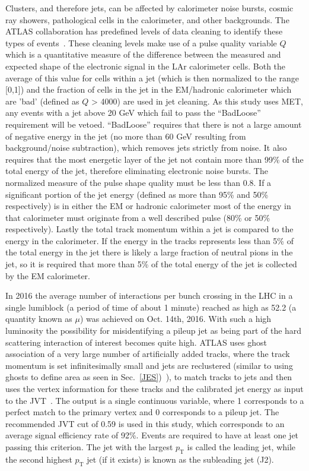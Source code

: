 Clusters, and therefore jets, can be affected by calorimeter noise bursts, cosmic ray showers, pathological cells in the calorimeter, and other backgrounds.  
The ATLAS collaboration has predefined levels of data cleaning to identify these types of events~\cite{ATLAS-CONF-2015-029}.  
These cleaning levels make use of a pulse quality variable $Q$ which is a quantitative measure of the difference between the measured and expected shape of the electronic signal in the LAr calorimeter cells.  
Both the average of this value for cells within a jet (which is then normalized to the range [0,1]) and the fraction of cells in the jet in the EM/hadronic calorimeter which are 'bad' (defined as $Q$ > 4000) are used in jet cleaning.  
As this study uses MET, any events with a jet above 20 GeV which fail to pass the ``BadLoose'' requirement will be vetoed.  
``BadLoose'' requires that there is not a large amount of negative energy in the jet (no more than 60 GeV resulting from background/noise subtraction), which removes jets strictly from noise.   
It also requires that the most energetic layer of the jet not contain more than 99\% of the total energy of the jet, therefore eliminating electronic noise bursts.   
The normalized measure of the pulse shape quality must be less than 0.8.  
If a significant portion of the jet energy (defined as more than 95\% and 50\% respectively) is in either the EM or hadronic calorimeter most of the energy in that calorimeter must originate from a well described pulse (80\% or 50\% respectively).  
Lastly the total track momentum within a jet is compared to the energy in the calorimeter.  
If the energy in the tracks represents less than 5\% of the total energy in the jet there is likely a large fraction of neutral pions in the jet, so it is required that more than 5\% of the total energy of the jet is collected by the EM calorimeter.  

In 2016 the average number of interactions per bunch crossing in the LHC in a single lumiblock (a period of time of about 1 minute) reached as high as 52.2 (a quantity known as $\mu$)  was achieved on Oct. 14th, 2016.  
With such a high luminosity the possibility for misidentifying a pileup jet as being part of the hard scattering interaction of interest becomes quite high.  
ATLAS uses ghost association of a very large number of artificially added tracks, where the track momentum is set infinitesimally small and jets are reclustered (similar to using ghosts to define area as seen in Sec.~\ref{JES})~\cite{ATLAS-CONF-2013-083}), to match tracks to jets and then uses the vertex information for these tracks and the calibrated jet energy as input to the \gls{JVT}~\cite{ATLAS-CONF-2014-018}.  
The output is a single continuous variable, where 1 corresponds to a perfect match to the primary vertex and 0 corresponds to a pileup jet.  
The recommended JVT cut of 0.59 is used in this study, which corresponds to an average signal efficiency rate of 92\%.  
Events are required to have at least one jet passing this criterion.  
The jet with the largest $p_{\mathrm T}$ is called the leading jet, while the second highest $p_{\mathrm T}$ jet (if it exists) is known as the subleading jet (J2).  

